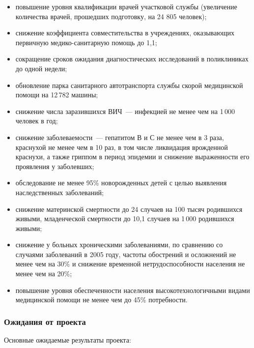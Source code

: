\documentclass[article, 12pt, russian, oneside]{ncc}
\begin{document}
\begin{itemize}
\item повышение уровня квалификации врачей участковой службы
  (увеличение количества врачей, прошедших подготовку, на 24 805
  человек);
\item снижение коэффициента совместительства в учреждениях,
  оказывающих первичную медико-санитарную помощь до 1,1;
\item сокращение сроков ожидания диагностических исследований в
  поликлиниках до одной недели;
\item обновление парка санитарного автотранспорта службы скорой
  медицинской помощи на 12\,782 машины;
\item снижение числа заразившихся ВИЧ~--- инфекцией не менее чем на
  1\,000 человек в год;
\item снижение заболеваемости~--- гепатитом В и С не менее чем в 3 раза,
  краснухой не менее чем в 10 раз, в том числе ликвидация врожденной
  краснухи, а также гриппом в период эпидемии и снижение выраженности
  его проявления у заболевших;
\item обследование не менее 95\% новорожденных детей с целью выявления
  наследственных заболеваний;
\item снижение материнской смертности до 24 случаев на 100 тысяч
  родившихся живыми, младенческой смертности до 10,1 случаев на 1\,000
  родившихся живыми;
\item снижение у больных хроническими заболеваниями, по сравнению со
  случаями заболеваний в 2005 году, частоты обострений и осложнений не
  менее чем на 30\% и снижение временной нетрудоспособности населения
  не менее чем на 20\%;
\item повышение уровня обеспеченности населения высокотехнологичными
  видами медицинской помощи не менее чем до 45\% потребности.
\end{itemize}

\subsubsection{Ожидания от проекта}

Основные ожидаемые результаты проекта:
\end{document}
